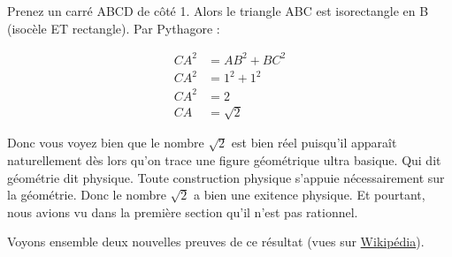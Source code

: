\documentclass[a4paper, 11pt, twoside]{book}
\begin{document}
Prenez un carré ABCD de côté 1. Alors le triangle ABC est
isorectangle en B (isocèle ET rectangle). Par Pythagore :

\begin{align*}
 CA^2 &= AB^2 + BC^2\\
 CA^2 &= 1^2 + 1^2\\
 CA^2 &= 2\\
 CA &= \sqrt{2}
\end{align*}

Donc vous voyez bien que le nombre \(\sqrt{2}\) est bien réel
puisqu'il apparaît naturellement dès lors qu'on trace une figure
géométrique ultra basique. Qui dit géométrie dit physique. Toute
construction physique s'appuie nécessairement sur la
géométrie. Donc le nombre \(\sqrt{2}\) a bien une exitence
physique. Et pourtant, nous avions vu dans la première section
qu'il n'est pas rationnel.

Voyons ensemble deux nouvelles preuves de ce résultat (vues sur
\href{https://fr.wikipedia.org/wiki/Racine\_carr\%C3\%A9e\_de\_deux\#Preuves\_d'irrationalit\%C3\%A9}{Wikipédia}).
\end{document}
